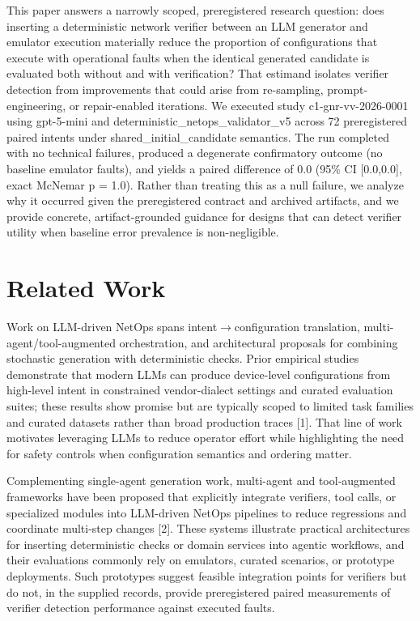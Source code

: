 \documentclass[conference]{IEEEtran}
\begin{document}
This paper answers a narrowly scoped, preregistered research question: does inserting a deterministic network verifier between an LLM generator and emulator execution materially reduce the proportion of configurations that execute with operational faults when the identical generated candidate is evaluated both without and with verification? That estimand isolates verifier detection from improvements that could arise from re-sampling, prompt-engineering, or repair-enabled iterations. We executed study c1-gnr-vv-2026-0001 using gpt-5-mini and deterministic\_netops\_validator\_v5 across 72 preregistered paired intents under shared\_initial\_candidate semantics. The run completed with no technical failures, produced a degenerate confirmatory outcome (no baseline emulator faults), and yields a paired difference of 0.0 (95\% CI [0.0,0.0], exact McNemar p = 1.0). Rather than treating this as a null failure, we analyze why it occurred given the preregistered contract and archived artifacts, and we provide concrete, artifact-grounded guidance for designs that can detect verifier utility when baseline error prevalence is non-negligible.

\section{Related Work}
Work on LLM-driven NetOps spans intent\ensuremath{\rightarrow}configuration translation, multi-agent/tool-augmented orchestration, and architectural proposals for combining stochastic generation with deterministic checks. Prior empirical studies demonstrate that modern LLMs can produce device-level configurations from high-level intent in constrained vendor-dialect settings and curated evaluation suites; these results show promise but are typically scoped to limited task families and curated datasets rather than broad production traces [1]. That line of work motivates leveraging LLMs to reduce operator effort while highlighting the need for safety controls when configuration semantics and ordering matter.

Complementing single-agent generation work, multi-agent and tool‑augmented frameworks have been proposed that explicitly integrate verifiers, tool calls, or specialized modules into LLM-driven NetOps pipelines to reduce regressions and coordinate multi-step changes [2]. These systems illustrate practical architectures for inserting deterministic checks or domain services into agentic workflows, and their evaluations commonly rely on emulators, curated scenarios, or prototype deployments. Such prototypes suggest feasible integration points for verifiers but do not, in the supplied records, provide preregistered paired measurements of verifier detection performance against executed faults.
\end{document}
